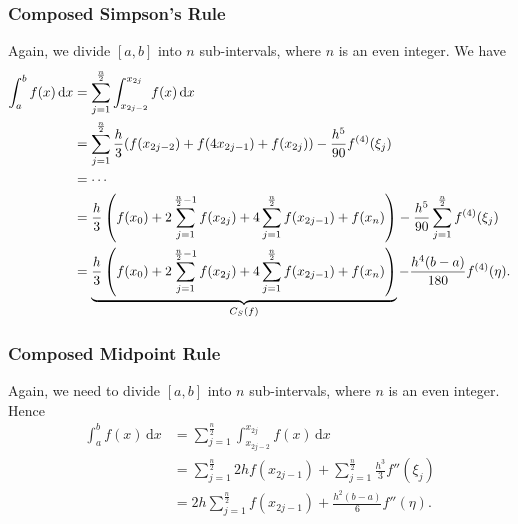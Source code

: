 \documentclass[class=article, crop=false]{standalone}
\begin{document}
  \subsubsection{Composed Simpson's Rule}
  Again, we divide $[a, b]$ into $n$ sub-intervals, where $n$ is an even integer. We have
  \begin{align*}
    \int_{a}^{b}f(x) \,\mathrm dx &= \sum_{j=1}^{\frac{n}{2}} \int_{x_{2j - 2}}^{x_{2j}}f(x) \,\mathrm dx \\
                                  &= \sum_{j=1}^{\frac{n}{2}} \frac{h}{3}(f(x_{2j - 2}) + f(4x_{2j - 1}) + f(x_{2j})) - \frac{h^5}{90}f^{(4)}(\xi_j) \\
                                  &= \dotsb \\
                                  &= \frac{h}{3}\left( f(x_0) + 2\sum_{j=1}^{\frac{n}{2} - 1}f(x_{2j}) + 4\sum_{j=1}^{\frac{n}{2}} f(x_{2j - 1}) + f(x_n) \right) - \frac{h^5}{90}\sum_{j=1}^{\frac{n}{2}}f^{(4)}(\xi_j) \\
                                  &= \underbrace{\frac{h}{3}\left( f(x_0) + 2\sum_{j=1}^{\frac{n}{2} - 1}f(x_{2j}) + 4\sum_{j=1}^{\frac{n}{2}} f(x_{2j - 1}) + f(x_n) \right)}_{C_S(f)} - \frac{h^4(b - a)}{180}f^{(4)}(\eta).
  \end{align*}
  \subsubsection{Composed Midpoint Rule}
  Again, we need to divide $[a, b]$ into $n$ sub-intervals, where $n$ is an even integer. Hence
  \begin{align*}
    \int_{a}^{b}f(x) \,\mathrm dx &= \sum_{j=1}^{\frac{n}{2}} \int_{x_{2j - 2}}^{x_{2j}}f(x) \,\mathrm dx \\
                                  &= \sum_{j=1}^{\frac{n}{2}} 2hf(x_{2j - 1}) + \sum_{j=1}^{\frac{n}{2}} \frac{h^3}{3}f''(\xi_j) \\
                                  &= 2h \sum_{j=1}^{\frac{n}{2}}f(x_{2j - 1}) + \frac{h^2(b - a)}{6}f''(\eta).
  \end{align*}
\end{document}
